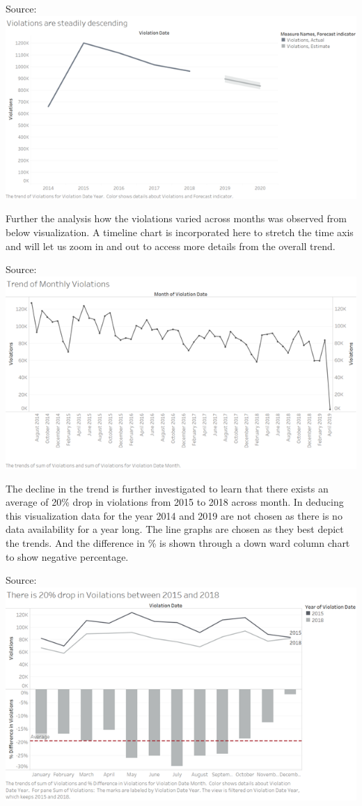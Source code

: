 \documentclass[]{book}
\begin{document}
Source:\citep{tableau}
\includegraphics{images/Image2.png}

Further the analysis how the violations varied across months was observed from below visualization. A timeline chart is incorporated here to stretch the time axis and will let us zoom in and out to access more details from the overall trend.

Source:\citep{tableau}
\includegraphics{images/Image3.png}

The decline in the trend is further investigated to learn that there exists an average of 20\% drop in violations from 2015 to 2018 across month. In deducing this visualization data for the year 2014 and 2019 are not chosen as there is no data availability for a year long. The line graphs are chosen as they best depict the trends. And the difference in \% is shown through a down ward column chart to show negative percentage.

Source:\citep{tableau}
\includegraphics{images/Image4.png}
\end{document}
